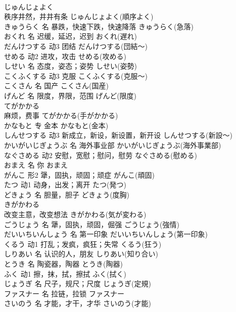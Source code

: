 \documentclass[8pt]{extreport}
\begin{document}
\begin{CJK}{UTF8}{min}
\\	じゅんじょよく	
\\	秩序井然，井井有条	じゅんじょよく(順序よく)	
\\	きゅうらく	名	暴跌，快速下跌，快速降落	きゅうらく(急落)	
\\	おくれ	名	迟缓，延迟，迟到	おくれ(遅れ)	
\\	だんけつする	动3	团结	だんけつする(団結～)	
\\	せめる	动2	进攻，攻击	せめる(攻める)	
\\	しせい	名	态度，姿态；姿势	しせい(姿勢)	
\\	こくふくする	动3	克服	こくふくする(克服～)	
\\	こくさん	名	国产	こくさん(国産)	
\\	げんど	名	限度，界限，范围	げんど(限度)	
\\	てがかかる	
\\	麻烦，费事	てがかかる(手がかかる)	
\\	かなもと	专	金本	かなもと(金本)	
\\	しんせつする	动3	新成立，新设，新设置，新开设	しんせつする(新設～)	
\\	かいがいじぎょうぶ	名	海外事业部	かいがいじぎょうぶ(海外事業部)	
\\	なぐさめる	动2	安慰，宽慰；慰问，慰劳	なぐさめる(慰める)	
\\	おまえ	名	你	おまえ	
\\	がんこ	形2	犟，固执，顽固；顽症	がんこ(頑固)	
\\	たつ	动1	动身，出发；离开	たつ(発つ)	
\\	どきょう	名	胆量，胆子	どきょう(度胸)	
\\	きがかわる	
\\	改变主意，改变想法	きがかわる(気が変わる)	
\\	ごうじょう	名	犟，固执，顽固，倔强	ごうじょう(強情)	
\\	だいいちいんしょう	名	第一印象	だいいちいんしょう(第一印象)	
\\	くるう	动1	打乱；发疯，疯狂；失常	くるう(狂う)	
\\	しりあい	名	认识的人，朋友	しりあい(知り合い)	
\\	とうき	名	陶瓷器，陶器	とうき(陶器)	
\\	ふく	动1	擦，抹，拭，擦拭	ふく(拭く)	
\\	じょうぎ	名	尺子，规尺；尺度	じょうぎ(定規)	
\\	ファスナー	名	拉链，拉锁	ファスナー	
\\	さいのう	名	才能，才干，才华	さいのう(才能)	

\end{CJK}
\end{document}
